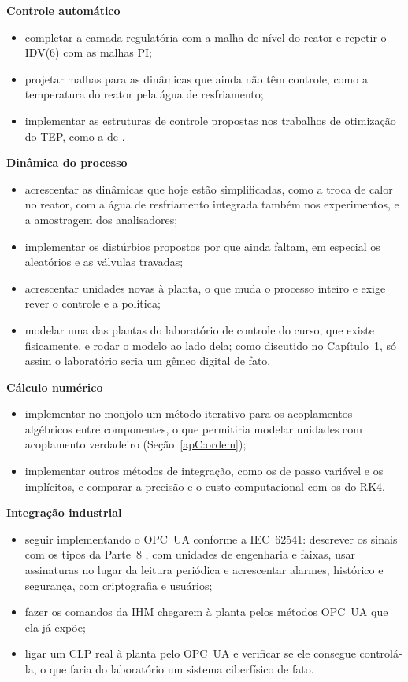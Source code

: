 \noindent\textbf{Controle automático}
\begin{itemize}
	\item completar a camada regulatória com a malha de nível do reator e repetir o IDV(6) com as malhas PI;
	\item projetar malhas para as dinâmicas que ainda não têm controle, como a temperatura do reator pela água de resfriamento;
	\item implementar as estruturas de controle propostas nos trabalhos de otimização do TEP, como a de .
\end{itemize}

\noindent\textbf{Dinâmica do processo}
\begin{itemize}
	\item acrescentar as dinâmicas que hoje estão simplificadas, como a troca de calor no reator, com a água de resfriamento integrada também nos experimentos, e a amostragem dos analisadores;
	\item implementar os distúrbios propostos por  que ainda faltam, em especial os aleatórios e as válvulas travadas;
	\item acrescentar unidades novas à planta, o que muda o processo inteiro e exige rever o controle e a política;
	\item modelar uma das plantas do laboratório de controle do curso, que existe fisicamente, e rodar o modelo ao lado dela; como discutido no Capítulo~1, só assim o laboratório seria um gêmeo digital de fato.
\end{itemize}

\noindent\textbf{Cálculo numérico}
\begin{itemize}
	\item implementar no monjolo um método iterativo para os acoplamentos algébricos entre componentes, o que permitiria modelar unidades com acoplamento verdadeiro (Seção~\ref{apC:ordem});
	\item implementar outros métodos de integração, como os de passo variável e os implícitos, e comparar a precisão e o custo computacional com os do RK4.
\end{itemize}

\noindent\textbf{Integração industrial}
\begin{itemize}
	\item seguir implementando o OPC~UA conforme a IEC~62541: descrever os sinais com os tipos da Parte~8 \cite{IEC62541_8}, com unidades de engenharia e faixas, usar assinaturas no lugar da leitura periódica e acrescentar alarmes, histórico e segurança, com criptografia e usuários;
	\item fazer os comandos da IHM chegarem à planta pelos métodos OPC~UA que ela já expõe;
	\item ligar um CLP real à planta pelo OPC~UA e verificar se ele consegue controlá-la, o que faria do laboratório um sistema ciberfísico de fato.
\end{itemize}
